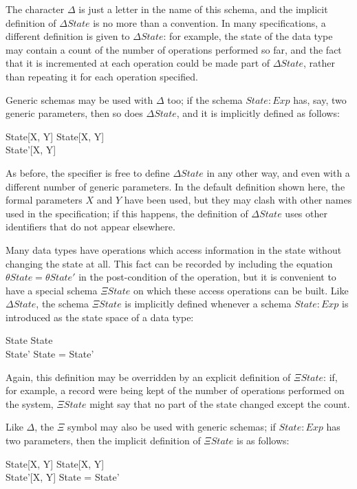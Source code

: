 The character $\Delta$ is just a letter in the name of this schema, and
the implicit definition of $\Delta State$ is no more than a convention.
In many specifications, a different definition is given to $\Delta State$:
for example, the state of the data type may contain a count of the number
of operations performed so far, and the fact that it is incremented at
each operation could be made part of $\Delta State$, rather than
repeating it for each operation specified.

\new Generic schemas may be used with $\Delta$ too; if the schema $State: Exp $
has, say, two generic parameters, then so does $\Delta State$, and it
is implicitly defined as follows:
\begin{schema}{\Delta State[X, Y]}
	State[X, Y] \\
	State'[X, Y]
\end{schema} 
As before, the specifier is free to define $\Delta State$ in any
other way, and even with a different number of generic parameters.
In the default definition shown here, the formal parameters $X$ and
$Y$ have been used, but they may clash with other names used in the
specification; if this happens, the definition of $\Delta State$
uses other identifiers that do not appear elsewhere.

Many data types have operations which
access information in the state without changing the state at all.
This fact can be recorded by including the equation $\theta State =
\theta State'$ in the post-condition of the operation, but it is
convenient to have a special schema $\Xi State$\symdex{$\Xi$} on
which these access operations can be built. Like $\Delta State$, the
schema $\Xi State$ is implicitly defined whenever a schema $State: Exp $
is introduced as the state space of a data type:  
\begin{schema}{\Xi State}
	State \\
	State'
\where
	\theta State = \theta State'
\end{schema}
Again, this definition may be overridden by an explicit definition of
$\Xi State$: if, for example, a record were being kept of the number
of operations performed on the system, $\Xi State$ might say that no
part of the state changed except the count.

Like $\Delta$, the $\Xi$ symbol may also be used with generic
schemas; if $State: Exp $ has two parameters, then the implicit definition
of $\Xi State$ is as follows:
\begin{schema}{\Xi State[X, Y]}
	State[X, Y] \\
	State'[X, Y]
\where
	\theta State = \theta State'
\end{schema}

